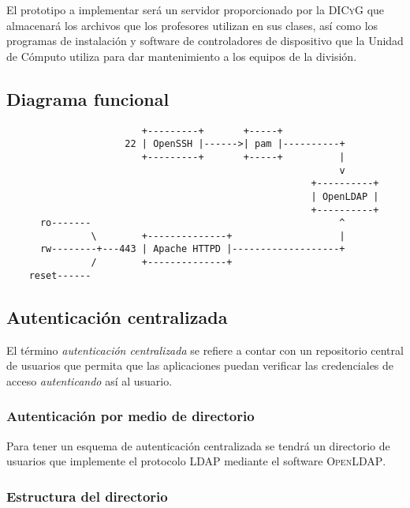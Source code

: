 El prototipo a implementar ser\'{a} un servidor proporcionado por la \textsc{DICyG} que almacenar\'{a} los archivos que los profesores utilizan en sus clases, as\'{i} como los programas de instalaci\'{o}n y software de controladores de dispositivo que la Unidad de C\'{o}mputo utiliza para dar mantenimiento a los equipos de la divisi\'{o}n.

      \subsection {Diagrama funcional}

{
\scriptsize
\linespread{1}
\begin{verbatim}
                        +---------+       +-----+
                     22 | OpenSSH |------>| pam |----------+
                        +---------+       +-----+          |
                                                           v
                                                      +----------+
                                                      | OpenLDAP |
                                                      +----------+
      ro-------                                            ^
               \        +--------------+                   |
      rw--------+---443 | Apache HTTPD |-------------------+
               /        +--------------+
    reset------

\end{verbatim}
}

      \subsection {Autenticaci\'{o}n centralizada}

El t\'{e}rmino \textit{autenticaci\'{o}n centralizada} se refiere a contar con un repositorio central de usuarios que permita que las aplicaciones puedan verificar las credenciales de acceso \textit{autenticando} as\'{i} al usuario.

        \subsubsection {Autenticaci\'{o}n por medio de directorio}

Para tener un esquema de autenticaci\'{o}n centralizada se tendr\'{a} un directorio de usuarios que implemente el protocolo LDAP mediante el software \textsc{OpenLDAP}.

        \subsubsection {Estructura del directorio}

